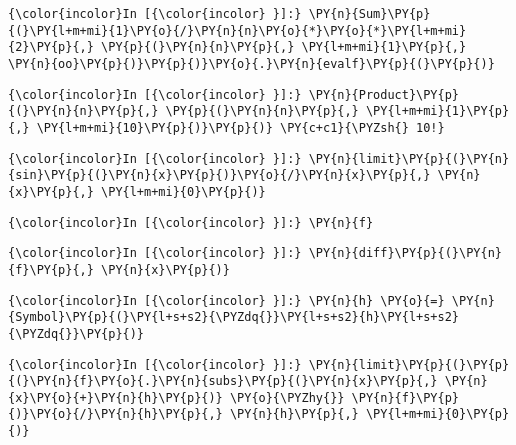     \begin{Verbatim}[commandchars=\\\{\}]
{\color{incolor}In [{\color{incolor} }]:} \PY{n}{Sum}\PY{p}{(}\PY{l+m+mi}{1}\PY{o}{/}\PY{n}{n}\PY{o}{*}\PY{o}{*}\PY{l+m+mi}{2}\PY{p}{,} \PY{p}{(}\PY{n}{n}\PY{p}{,} \PY{l+m+mi}{1}\PY{p}{,} \PY{n}{oo}\PY{p}{)}\PY{p}{)}\PY{o}{.}\PY{n}{evalf}\PY{p}{(}\PY{p}{)}
\end{Verbatim}



    \begin{Verbatim}[commandchars=\\\{\}]
{\color{incolor}In [{\color{incolor} }]:} \PY{n}{Product}\PY{p}{(}\PY{n}{n}\PY{p}{,} \PY{p}{(}\PY{n}{n}\PY{p}{,} \PY{l+m+mi}{1}\PY{p}{,} \PY{l+m+mi}{10}\PY{p}{)}\PY{p}{)} \PY{c+c1}{\PYZsh{} 10!}
\end{Verbatim}





    \begin{Verbatim}[commandchars=\\\{\}]
{\color{incolor}In [{\color{incolor} }]:} \PY{n}{limit}\PY{p}{(}\PY{n}{sin}\PY{p}{(}\PY{n}{x}\PY{p}{)}\PY{o}{/}\PY{n}{x}\PY{p}{,} \PY{n}{x}\PY{p}{,} \PY{l+m+mi}{0}\PY{p}{)}
\end{Verbatim}



    \begin{Verbatim}[commandchars=\\\{\}]
{\color{incolor}In [{\color{incolor} }]:} \PY{n}{f}
\end{Verbatim}

    \begin{Verbatim}[commandchars=\\\{\}]
{\color{incolor}In [{\color{incolor} }]:} \PY{n}{diff}\PY{p}{(}\PY{n}{f}\PY{p}{,} \PY{n}{x}\PY{p}{)}
\end{Verbatim}



    \begin{Verbatim}[commandchars=\\\{\}]
{\color{incolor}In [{\color{incolor} }]:} \PY{n}{h} \PY{o}{=} \PY{n}{Symbol}\PY{p}{(}\PY{l+s+s2}{\PYZdq{}}\PY{l+s+s2}{h}\PY{l+s+s2}{\PYZdq{}}\PY{p}{)}
\end{Verbatim}

    \begin{Verbatim}[commandchars=\\\{\}]
{\color{incolor}In [{\color{incolor} }]:} \PY{n}{limit}\PY{p}{(}\PY{p}{(}\PY{n}{f}\PY{o}{.}\PY{n}{subs}\PY{p}{(}\PY{n}{x}\PY{p}{,} \PY{n}{x}\PY{o}{+}\PY{n}{h}\PY{p}{)} \PY{o}{\PYZhy{}} \PY{n}{f}\PY{p}{)}\PY{o}{/}\PY{n}{h}\PY{p}{,} \PY{n}{h}\PY{p}{,} \PY{l+m+mi}{0}\PY{p}{)}
\end{Verbatim}





